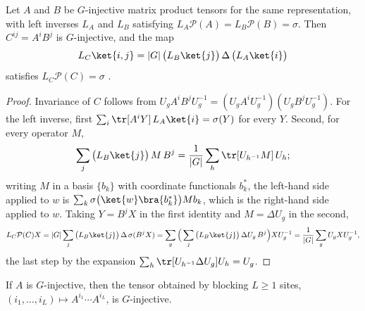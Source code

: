 \begin{lemma}%
    \label{thm:peps_mps_g_injective_concatenation}
    \leanok
    Let $A$ and $B$ be $G$-injective matrix product tensors for the same
    representation, with left inverses $L_A$ and $L_B$ satisfying
    $L_A\mathcal{P}(A)=L_B\mathcal{P}(B)=\sigma$. Then $C^{ij}=A^iB^j$ is
    $G$-injective, and the map
    \begin{align*}
        L_C\ket{i,j}=|G|\,\big(L_B\ket{j}\big)\,\Delta\,\big(L_A\ket{i}\big)
    \end{align*}
    satisfies $L_C\mathcal{P}(C)=\sigma$
    \cite[Section~``MPS: the $G$-injective case'']{Schuch2010PEPS}.
\end{lemma}

\begin{proof}\leanok
    Invariance of $C$ follows from
    $U_gA^iB^jU_g^{-1}=(U_gA^iU_g^{-1})(U_gB^jU_g^{-1})$. For the left
    inverse, first $\sum_i\tr[A^iY]\,L_A\ket{i}=\sigma(Y)$ for every $Y$.
    Second, for every operator $M$,
    \begin{align*}
        \sum_j\big(L_B\ket{j}\big)\,M\,B^j
        =\frac{1}{|G|}\sum_h\tr[U_{h^{-1}}M]\,U_h ;
    \end{align*}
    writing $M$ in a basis $\{b_k\}$ with coordinate functionals $b^*_k$,
    the left-hand side applied to $w$ is
    $\sum_k\sigma\big(\ket{w}\bra{b^*_k}\big)Mb_k$, which is the right-hand
    side applied to $w$. Taking $Y=B^jX$ in the first identity and
    $M=\Delta U_g$ in the second,
    \begin{align*}
        L_C\mathcal{P}(C)X
        =|G|\sum_j\big(L_B\ket{j}\big)\,\Delta\,\sigma(B^jX)
        =\sum_g\Big(\sum_j\big(L_B\ket{j}\big)\,\Delta U_g\,B^j\Big)XU_g^{-1}
        =\frac{1}{|G|}\sum_gU_gXU_g^{-1},
    \end{align*}
    the last step by the expansion
    $\sum_h\tr[U_{h^{-1}}\Delta U_g]U_h=U_g$.
\end{proof}

\begin{lemma}%
    \label{cor:peps_mps_g_injective_blocking}
    \leanok
    If $A$ is $G$-injective, then the tensor obtained by blocking $L\ge1$
    sites, $(i_1,\dots,i_L)\mapsto A^{i_1}\cdots A^{i_L}$, is $G$-injective.
\end{lemma}

